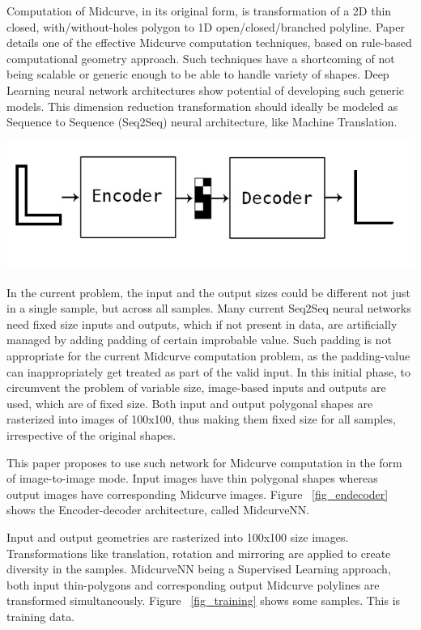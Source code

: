 \documentclass[9pt,academicons]{article}
\begin{document}
		
Computation of Midcurve, in its original form, is transformation of a 2D thin closed, with/without-holes polygon to 1D open/closed/branched polyline. Paper \cite{dimred2017} details one of the effective Midcurve computation techniques, based on rule-based computational geometry approach. Such techniques have a shortcoming of not being scalable or generic enough to be able to handle variety of shapes. Deep Learning neural network architectures show potential of developing such generic models. This dimension reduction transformation should ideally be modeled as Sequence to Sequence (Seq2Seq) neural architecture, like Machine Translation. 

     \begin{center}
	\includegraphics[width=0.8\linewidth]{images/midcurve_encoder_decoder}
	\label{fig_endecoder}
    \end{center}
    
    
In the current problem, the input and the output sizes could be different not just in a single sample, but across all samples. Many current Seq2Seq neural networks need fixed size inputs and outputs, which if not present in data, are artificially managed by adding padding of certain improbable value. Such padding is not appropriate for the current Midcurve computation problem, as the padding-value can inappropriately get treated as part of the valid input. In this initial phase, to circumvent the problem of variable size, image-based inputs and outputs are used, which are of fixed size. Both input and output polygonal shapes are rasterized into images of 100x100, thus making them fixed size for all samples, irrespective of the original shapes.

This paper proposes to use such network for Midcurve computation in the form of image-to-image mode. Input images have thin polygonal shapes whereas output images have corresponding Midcurve images. Figure ~\ref{fig_endecoder} shows the Encoder-decoder architecture, called MidcurveNN.


    
Input and output geometries are rasterized into 100x100 size images. Transformations like translation, rotation and mirroring are applied to create diversity in the samples. MidcurveNN being a Supervised Learning approach, both input thin-polygons and corresponding output Midcurve polylines are transformed simultaneously. Figure ~\ref{fig_training} shows some samples. This is training data.    
\end{document}
